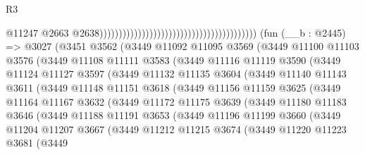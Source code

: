 \begin{lexlean}{R3}
\begin{coremodule}
                                                                                      @11247
                                                                                      @2663
                                                                                      @2638)))))))))))))))))))))))))))))))))))))))))
    (fun (__b : @2445) =>
    @3027
      (@3451
        @3562
        (@3449
          @11092
          @11095
          @3569
          (@3449
            @11100
            @11103
            @3576
            (@3449
              @11108
              @11111
              @3583
              (@3449
                @11116
                @11119
                @3590
                (@3449
                  @11124
                  @11127
                  @3597
                  (@3449
                    @11132
                    @11135
                    @3604
                    (@3449
                      @11140
                      @11143
                      @3611
                      (@3449
                        @11148
                        @11151
                        @3618
                        (@3449
                          @11156
                          @11159
                          @3625
                          (@3449
                            @11164
                            @11167
                            @3632
                            (@3449
                              @11172
                              @11175
                              @3639
                              (@3449
                                @11180
                                @11183
                                @3646
                                (@3449
                                  @11188
                                  @11191
                                  @3653
                                  (@3449
                                    @11196
                                    @11199
                                    @3660
                                    (@3449
                                      @11204
                                      @11207
                                      @3667
                                      (@3449
                                        @11212
                                        @11215
                                        @3674
                                        (@3449
                                          @11220
                                          @11223
                                          @3681
                                          (@3449

\end{coremodule}
\end{lexlean}
